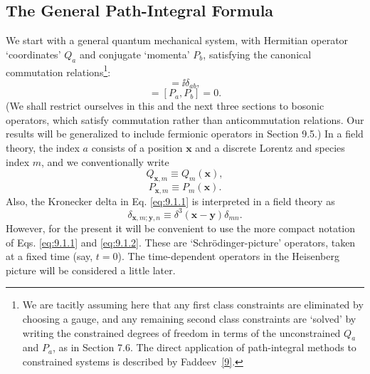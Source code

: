 \subsection{The General Path-Integral Formula}

We start with a general quantum mechanical system, with Hermitian operator
`coordinates' $Q_a$ and conjugate `momenta' $P_b$, satisfying the canonical
commutation relations\footnote{We are tacitly assuming here that any first
class constraints are eliminated by choosing a gauge, and any remaining
second class constraints are `solved' by writing the constrained degrees of
freedom in terms of the unconstrained $Q_a$ and $P_a$, as in Section 7.6.
The direct application of path-integral methods to constrained systems is
described by Faddeev~\hyperref[ref:9.9]{[9]}.}:
\begin{equation}
  [Q_a,P_b]=\ii\delta_{ab},
  \tag{9.1.1}\label{eq:9.1.1}
\end{equation}
\begin{equation}
  [Q_a,Q_b]=[P_a,P_b]=0.
  \tag{9.1.2}\label{eq:9.1.2}
\end{equation}
(We shall restrict ourselves in this and the next three sections to bosonic
operators, which satisfy commutation rather than anticommutation relations.
Our results will be generalized to include fermionic operators in Section 9.5.)
In a field theory, the index $a$ consists of a position $\mathbf{x}$ and a
discrete Lorentz and species index $m$, and we conventionally write
\begin{equation}
  Q_{\mathbf{x},m}\equiv Q_m(\mathbf{x}),
  \tag{9.1.3}\label{eq:9.1.3}
\end{equation}
\begin{equation}
  P_{\mathbf{x},m}\equiv P_m(\mathbf{x}).
  \tag{9.1.4}\label{eq:9.1.4}
\end{equation}
Also, the Kronecker delta in Eq. \eqref{eq:9.1.1} is interpreted in a field theory as
\begin{equation}
  \delta_{\mathbf{x},m;\mathbf{y},n}\equiv
  \delta^3(\mathbf{x}-\mathbf{y})\delta_{mn}.
  \tag{9.1.5}\label{eq:9.1.5}
\end{equation}
However, for the present it will be convenient to use the more compact
notation of Eqs. \eqref{eq:9.1.1} and \eqref{eq:9.1.2}. These are `Schr\"odinger-picture'
operators, taken at a fixed time (say, $t=0$). The time-dependent operators
in the Heisenberg picture will be considered a little later.

